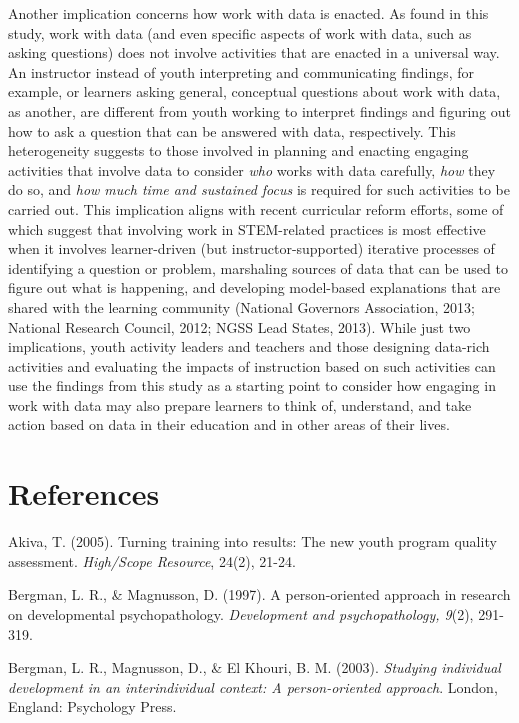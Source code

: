 \documentclass[]{book}
\theoremstyle{definition}
\theoremstyle{definition}
\theoremstyle{definition}
\theoremstyle{remark}
\begin{document}
Another implication concerns how work with data is enacted. As found in
this study, work with data (and even specific aspects of work with data,
such as asking questions) does not involve activities that are enacted
in a universal way. An instructor instead of youth interpreting and
communicating findings, for example, or learners asking general,
conceptual questions about work with data, as another, are different
from youth working to interpret findings and figuring out how to ask a
question that can be answered with data, respectively. This
heterogeneity suggests to those involved in planning and enacting
engaging activities that involve data to consider \emph{who} works with
data carefully, \emph{how} they do so, and \emph{how much time and
sustained focus} is required for such activities to be carried out. This
implication aligns with recent curricular reform efforts, some of which
suggest that involving work in STEM-related practices is most effective
when it involves learner-driven (but instructor-supported) iterative
processes of identifying a question or problem, marshaling sources of
data that can be used to figure out what is happening, and developing
model-based explanations that are shared with the learning community
(National Governors Association, 2013; National Research Council, 2012;
NGSS Lead States, 2013). While just two implications, youth activity
leaders and teachers and those designing data-rich activities and
evaluating the impacts of instruction based on such activities can use
the findings from this study as a starting point to consider how
engaging in work with data may also prepare learners to think of,
understand, and take action based on data in their education and in
other areas of their lives.

\chapter{References}\label{references}

\setlength{\parindent}{-0.2in} \setlength{\leftskip}{0.2in}
\setlength{\parskip}{8pt} \noindent

Akiva, T. (2005). Turning training into results: The new youth program
quality assessment. \emph{High/Scope Resource}, 24(2), 21-24.

Bergman, L. R., \& Magnusson, D. (1997). A person-oriented approach in
research on developmental psychopathology. \emph{Development and
psychopathology, 9}(2), 291-319.

Bergman, L. R., Magnusson, D., \& El Khouri, B. M. (2003).
\emph{Studying individual development in an interindividual context: A
person-oriented approach}. London, England: Psychology Press.
\end{document}
